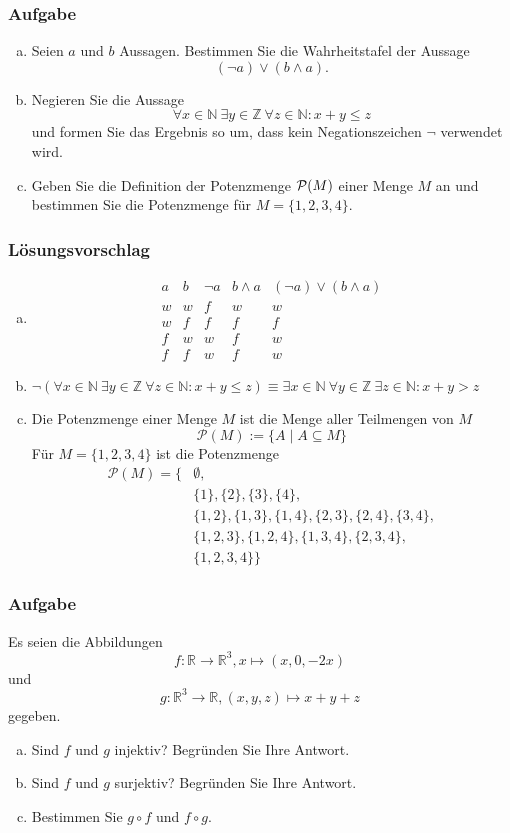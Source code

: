 \documentclass[a4paper,11pt]{scrartcl}
\newcounter{auf}
\newcommand{\Aufgabe}%
        {\addtocounter{auf}{1} \subsubsection*{\rmfamily  Aufgabe \theauf \hspace{1em}} }
\newcommand{\N}{\mathbb{N}}
\newcommand{\RR}{\mathbb{R}}
\newcommand{\Z}{\mathbb{Z}}
\begin{document}
\Aufgabe

\begin{enumerate}[a)]

\item Seien $a$ und $b$  Aussagen. 
Bestimmen Sie die Wahrheitstafel der Aussage
$$
	(\neg a) \lor (b \land a).
$$
\item Negieren Sie die Aussage 
$$
\forall x \in \N\ \exists y \in \Z\ \forall z \in \N: x+y \le z
$$
und formen Sie das Ergebnis so um, dass kein Negationszeichen $\neg$ verwendet wird.
\item Geben Sie die Definition der Potenzmenge ${\cal P}(M)$ einer Menge $M$ an und bestimmen Sie die Potenzmenge für $M = \{1,2,3,4\}.$
\end{enumerate}

\subsubsection*{Lösungsvorschlag}
\begin{enumerate}[a)]

\item $$\begin{array}{c|c||c|c||c}
a&b&\neg a&b\land a&(\neg a)\lor(b\land a)\\ \hline
w&w&f&w&w\\
w&f&f&f&f\\
f&w&w&f&w\\
f&f&w&f&w
\end{array}$$
\item $\neg(\forall x \in \N\ \exists y \in \Z\ \forall z \in \N: x+y \le z) \equiv \exists x \in \N \ \forall y \in \Z\ \exists z \in \N: x+y>z$ 
\item Die Potenzmenge einer Menge $M$ ist die Menge aller Teilmengen von $M$
$$
\mathcal{P}(M):=\{A \mid A \subseteq M\}
$$
Für $M=\{1,2,3,4\}$ ist die Potenzmenge
\begin{align*}
\mathcal{P}(M)=\Big\{&\emptyset,\\
&\{1\},\{2\},\{3\},\{4\},\\
&\{1,2\},\{1,3\},\{1,4\},\{2,3\},\{2,4\},\{3,4\},\\
&\{1,2,3\},\{1,2,4\},\{1,3,4\},\{2,3,4\},\\
&\{1,2,3,4\}\Big\}
\end{align*}
\end{enumerate}



\newpage
\Aufgabe
Es seien die Abbildungen $$f:\RR \to \RR^3, x \mapsto (x, 0, -2x)$$ und $$g: \RR^3 \to \RR, (x,y,z) \mapsto x+y+z$$ gegeben. 
\begin{enumerate}[a)]
\item Sind $f$ und $g$ injektiv? Begründen Sie Ihre Antwort.
\item Sind $f$ und $g$ surjektiv? Begründen Sie Ihre Antwort.
\item Bestimmen Sie $g \circ f$ und $f\circ g$.
\end{enumerate}
\end{document}
